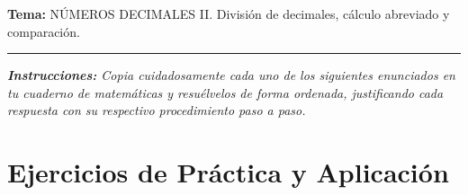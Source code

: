\documentclass[12pt, letterpaper]{article}
\begin{document}
	\vspace{0.2cm}
	\noindent \textbf{Tema:} NÚMEROS DECIMALES II. División de decimales, cálculo abreviado y comparación.
	\vspace{0.2cm}
	\hrule
	\vspace{0.4cm}
	
	\noindent \textit{\textbf{Instrucciones:} Copia cuidadosamente cada uno de los siguientes enunciados en tu cuaderno de matemáticas y resuélvelos de forma ordenada, justificando cada respuesta con su respectivo procedimiento paso a paso.}
	\vspace{0.6cm}
	
	\section*{Ejercicios de Práctica y Aplicación}
	
\end{document}
